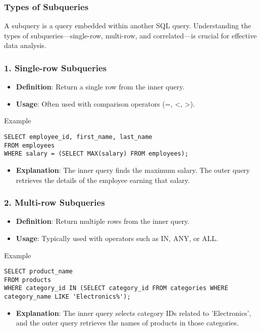 \documentclass[aspectratio=169]{beamer}
\begin{document}
\begin{frame}
    \frametitle{Types of Subqueries}
    A subquery is a query embedded within another SQL query. 
    Understanding the types of subqueries—single-row, multi-row, and correlated—is crucial for effective data analysis.
\end{frame}

\begin{frame}[fragile]
    \frametitle{1. Single-row Subqueries}
    \begin{itemize}
        \item \textbf{Definition}: Return a single row from the inner query.
        \item \textbf{Usage}: Often used with comparison operators (=, <, >).
    \end{itemize}
    \begin{block}{Example}
        \begin{lstlisting}
SELECT employee_id, first_name, last_name
FROM employees
WHERE salary = (SELECT MAX(salary) FROM employees);
        \end{lstlisting}
    \end{block}
    \begin{itemize}
        \item \textbf{Explanation}: The inner query finds the maximum salary.
        The outer query retrieves the details of the employee earning that salary.
    \end{itemize}
\end{frame}

\begin{frame}[fragile]
    \frametitle{2. Multi-row Subqueries}
    \begin{itemize}
        \item \textbf{Definition}: Return multiple rows from the inner query.
        \item \textbf{Usage}: Typically used with operators such as IN, ANY, or ALL.
    \end{itemize}
    \begin{block}{Example}
        \begin{lstlisting}
SELECT product_name
FROM products
WHERE category_id IN (SELECT category_id FROM categories WHERE category_name LIKE 'Electronics%');
        \end{lstlisting}
    \end{block}
    \begin{itemize}
        \item \textbf{Explanation}: The inner query selects category IDs related to 'Electronics',
        and the outer query retrieves the names of products in those categories.
    \end{itemize}
\end{frame}
\end{document}
